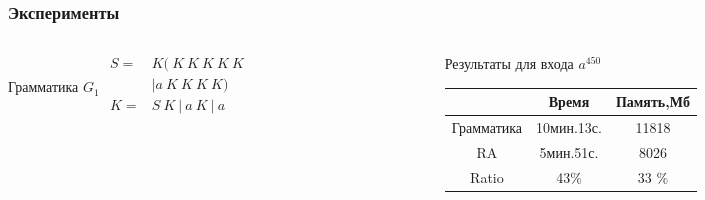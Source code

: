 \documentclass{beamer}
\begin{document}
	\begin{frame} 
		\frametitle{Эксперименты}
		\begin{center}
            \begin{columns}
        	    \begin{column}{3.5cm}
          	     Грамматика $G_1$
                   \vspace{2pt}
                $
                \begin{array}{rl}
                S =& K(\ K\ K\ K\ K\ K \ \\
                &| a\ K\ K\ K\ K) \\
                K =& S\ K\ |\ a\ K\ |\ a \\
                \end{array}
                $
       			\end{column}
       			\begin{column}{6cm}
            				Результаты для входа $a^{450}$
                \\
                \vspace{2pt}
                \begin{tabular}{ | c | c | c | }
                    \hline
                    & Время &   Память,Мб\\ \hline
                    Грамматика& 10мин.13с.  &  11818 \\ \hline 
                    RA       & 5мин.51с.  & 8026  \\ \hline \hline
                    Ratio   &  43$\%$       &  33 $\%$ \\ \hline
                \end{tabular}
            			\end{column}
	    \end{columns}
    \begin{tikzpicture}[scale=.7]

\end{tikzpicture}
\end{center}
\end{frame}
\end{document}
